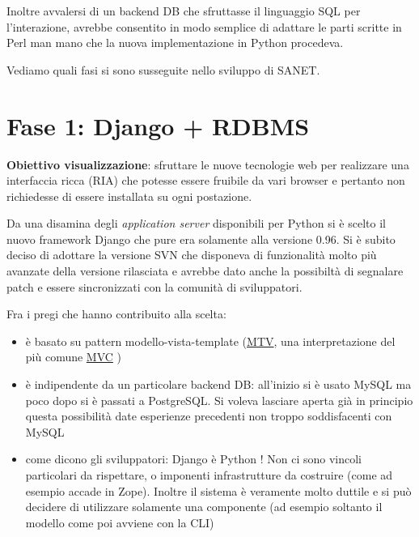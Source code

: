 \documentclass[a4wide,10pt,italian]{manual}
\begin{document}
Inoltre avvalersi di un backend DB che sfruttasse il linguaggio SQL per l'interazione,
avrebbe consentito in modo semplice di adattare le parti scritte in Perl man mano
che la nuova implementazione in Python procedeva.

Vediamo quali fasi si sono susseguite nello sviluppo di SANET.


\section{Fase 1: Django + RDBMS}

\textbf{Obiettivo visualizzazione}: sfruttare le nuove tecnologie web per realizzare una
interfaccia ricca (RIA) che potesse essere fruibile da vari browser e pertanto
non richiedesse di essere installata su ogni postazione.

Da una disamina degli \emph{application server} disponibili per Python si è scelto il nuovo
framework Django che pure era solamente alla versione 0.96.
Si è subito deciso di adottare la versione SVN che disponeva di funzionalità molto più
avanzate della versione rilasciata e avrebbe dato anche la possibiltà di segnalare patch
e essere sincronizzati con la comunità di sviluppatori.

Fra i pregi che hanno contribuito alla scelta:
\begin{itemize}
\item {} 
è basato su pattern modello-vista-template (\href{http://docs.djangoproject.com/en/dev/faq/general/\#django-appears-to-be-a-mvc-framework-but-you-call-the-controller-the-view-and-the-view-the-template-how-come-you-don-t-use-the-standard-names}{MTV}, una interpretazione del più comune \href{http://en.wikipedia.org/wiki/Model\%E2\%80\%93view\%E2\%80\%93controller}{MVC} )

\item {} 
è indipendente da un particolare backend DB: all'inizio si è usato MySQL ma poco dopo si è passati a PostgreSQL.
Si voleva lasciare aperta già in principio questa possibilità date esperienze precedenti non troppo soddisfacenti
con MySQL

\item {} 
come dicono gli sviluppatori: Django è Python ! Non ci sono vincoli particolari da rispettare,
o imponenti infrastrutture da costruire (come ad esempio accade in Zope). Inoltre il sistema è veramente molto
duttile e si può decidere di utilizzare solamente una componente (ad esempio soltanto il modello come poi avviene con la CLI)

\end{itemize}
\end{document}
